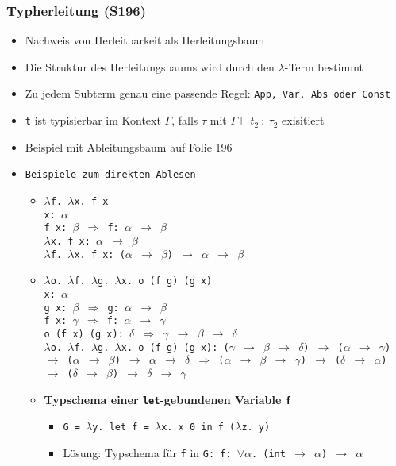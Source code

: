 \subsubsection{Typherleitung (S196)} %
\begin{itemize}
	\item Nachweis von Herleitbarkeit als Herleitungsbaum
	\item Die Struktur des Herleitungsbaums wird durch den \(\lambda\)-Term bestimmt
	\item Zu jedem Subterm genau eine passende Regel: \texttt{App, Var, Abs oder Const}
	\item \texttt{t} ist typisierbar im Kontext \(\Gamma\), falls \(\tau\) mit \(\Gamma\vdash t_2~:~\tau_2\) exisitiert
	\item Beispiel mit Ableitungsbaum auf Folie 196
	\item \texttt{Beispiele zum direkten Ablesen}
	\begin{itemize}
		\item \texttt{\(\lambda\)f. \(\lambda\)x. f x \\ x: \(\alpha\) \\ f x: \(\beta\) \(\Rightarrow\) f: \(\alpha\) \(\rightarrow\) \(\beta\) \\ \(\lambda\)x. f x: \(\alpha\) \(\rightarrow\) \(\beta\) \\ \(\lambda\)f. \(\lambda\)x. f x: (\(\alpha\) \(\rightarrow\) \(\beta\)) \(\rightarrow\) \(\alpha\) \(\rightarrow\) \(\beta\)}
		\item \texttt{\(\lambda\)o. \(\lambda\)f. \(\lambda\)g. \(\lambda\)x. o (f g) (g x) \\ x: \(\alpha\) \\ g x: \(\beta\) \(\Rightarrow\) g: \(\alpha\) \(\rightarrow\) \(\beta\) \\ f x: \(\gamma\) \(\Rightarrow\) f: \(\alpha\) \(\rightarrow\) \(\gamma\) \\ o (f x) (g x): \(\delta\) \(\Rightarrow\) \(\gamma\) \(\rightarrow\) \(\beta\) \(\rightarrow\) \(\delta\) \\ \(\lambda\)o. \(\lambda\)f. \(\lambda\)g. \(\lambda\)x. o (f g) (g x): (\(\gamma\) \(\rightarrow\) \(\beta\) \(\rightarrow\) \(\delta\)) \(\rightarrow\) (\(\alpha\) \(\rightarrow\) \(\gamma\)) \(\rightarrow\) (\(\alpha\) \(\rightarrow\) \(\beta\)) \(\rightarrow\) \(\alpha\) \(\rightarrow\) \(\delta\) \(\Rightarrow\)  (\(\alpha\) \(\rightarrow\) \(\beta\) \(\rightarrow\) \(\gamma\)) \(\rightarrow\) (\(\delta\) \(\rightarrow\) \(\alpha\)) \(\rightarrow\) (\(\delta\) \(\rightarrow\) \(\beta\)) \(\rightarrow\) \(\delta\) \(\rightarrow\) \(\gamma\)}
		\item \textbf{Typschema einer \texttt{let}-gebundenen Variable \texttt{f}}
		\begin{itemize}
			\item \texttt{G = \(\lambda\)y. let f = \(\lambda\)x. x 0 in f (\(\lambda\)z. y)}
			\item Lösung: Typschema für \texttt{f} in \texttt{G: f: \(\forall\)\(\alpha\). (int \(\rightarrow\) \(\alpha\)) \(\rightarrow\) \(\alpha\)}
		\end{itemize}
	\end{itemize}
\end{itemize}

